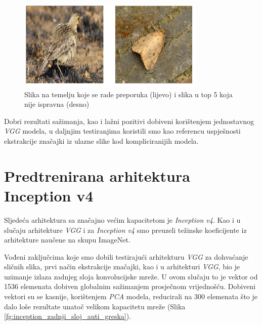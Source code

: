 \documentclass[times, utf8, proizvoljni, numeric]{fer}
\begin{document}
\begin{figure}[H]
\begin{center}
	\captionsetup{justification=centering}
	\includegraphics[width=0.8\textwidth]{./imgs/greske_vgg.png}
	\caption{Slika na temelju koje se rade preporuka (lijevo) i slika u top 5 koja nije ispravna (desno)}
	\label{fg:greske_vgg}
\end{center}
\end{figure}

Dobri rezultati sažimanja, kao i lažni pozitivi dobiveni korištenjem jednostavnog \textit{VGG} modela, u daljnjim testiranjima koristili smo kao referencu uspješnosti ekstrakcije značajki iz ulazne slike kod kompliciranijih modela.

\section{Predtrenirana arhitektura Inception v4}

Sljedeća arhitektura sa značajno većim kapacitetom je \textit{Inception v4}. Kao i u slučaju arhitekture \textit{VGG} i za \textit{Inception v4} smo preuzeli težinske koeficijente iz arhitekture naučene na skupu ImageNet.

Vođeni zaključcima koje smo dobili testirajući arhitekturu \textit{VGG} za dohvaćanje sličnih slika, prvi način ekstrakcije značajki, kao i u arhitekturi \textit{VGG}, bio je uzimanje izlaza zadnjeg sloja konvolucijske mreže. U ovom slučaju to je vektor od 1536 elemenata dobiven globalnim sažimanjem prosječnom vrijednošću. Dobiveni vektori su se kasnije, korištenjem \textit{PCA} modela, reducirali na 300 elemenata što je dalo loše rezultate unatoč velikom kapacitetu mreže (Slika \ref{fg:inception_zadnji_sloj_auti_greska}).
\end{document}
